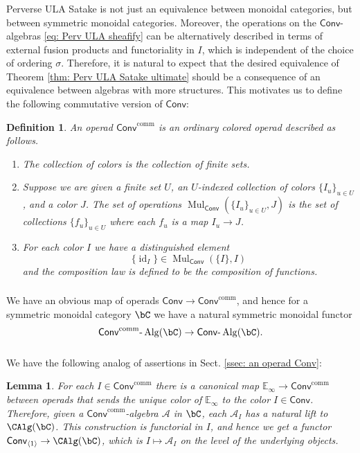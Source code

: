 \documentclass[10pt]{amsart}
\newcommand{\sssec}{\subsubsection}
\newtheorem{lemma}[subsubsection]{Lemma}
\newtheorem{defn}[subsubsection]{Definition}
\theoremstyle{remark}
\newcommand{\E}{\mathbb{E}}
\newcommand{\on}{\operatorname}
\newcommand{\cA}{\mathcal{A}}
\newcommand{\lAlg}{\text{-}\on{Alg}}
\newcommand{\id}{\on{id}}
\newcommand{\Mul}{\on{Mul}}
\newcommand{\Conv}{\mathsf{Conv}}
\newcommand{\Convcomm}{\mathsf{Conv}^{\on{comm}}}
\begin{document}
    \sssec{}
    Perverse ULA Satake is not just an equivalence between monoidal categories, but between symmetric monoidal categories. Moreover, the operations on the $\Conv$-algebras \eqref{eq: Perv ULA sheafify} can be alternatively described in terms of external fusion products and functoriality in $I$, which is independent of the choice of ordering $\sigma$. Therefore, it is natural to expect that the desired equivalence of Theorem \ref{thm: Perv ULA Satake ultimate} should be a consequence of an equivalence between algebras with more structures. This motivates us to define the following commutative version of $\Conv$:

    \begin{defn}\label{defn: operad Conv comm}
        An operad $\Convcomm$ is an ordinary colored operad described as follows.
    \begin{enumerate}
        \item The collection of colors is the collection of finite sets.
        \item Suppose we are given a finite set $U$, an $U$-indexed collection of colors $\{I_u\}_{u\in U}$, and a color $J$. The set of operations $\Mul_{\Conv}(\{I_u\}_{u\in U}, J)$ is the set of collections $\{f_{u}\}_{u\in U}$ where each $f_u$ is a map $I_u\rightarrow J$.
        \item For each color $I$ we have a distinguished element
        \[\{\id_I\}\in \Mul_{\Conv}(\{I\},I)\]
        and the composition law is defined to be the composition of functions.
    \end{enumerate}
    \end{defn}

    \sssec{}
    We have an obvious map of operads $\Conv\rightarrow\Convcomm$, and hence for a symmetric monoidal category $\bC$ we have a natural symmetric monoidal functor
    \begin{equation*}
        \Convcomm\lAlg(\bC)\rightarrow \Conv\lAlg(\bC).
    \end{equation*}

    \sssec{}
    We have the following analog of assertions in Sect. \ref{ssec: an operad Conv}:
    
    \begin{lemma}\label{lem: Convcomm and Einfty}
    For each $I\in\Convcomm$ there is a canonical map $\E_{\infty}\rightarrow \Convcomm$ between operads that sends the unique color of $\E_{\infty}$ to the color $I\in\Conv$. Therefore, given a $\Convcomm$-algebra $\cA$ in $\bC$, each $\cA_I$ has a natural lift to $\CAlg(\bC)$. This construction is functorial in $I$, and hence we get a functor $\Conv_{\langle 1\rangle}\rightarrow \CAlg(\bC)$, which is $I\mapsto \cA_I$ on the level of the underlying objects.
\end{lemma}
\end{document}
